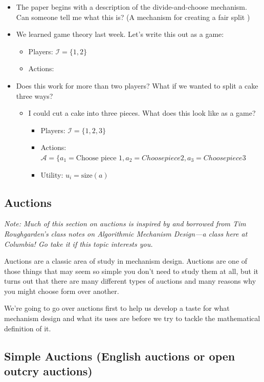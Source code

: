 \documentclass[11pt]{article}
\begin{document}
\begin{itemize}
    \item The paper begins with a description of the divide-and-choose mechanism. Can someone tell me what this is? (A mechanism for creating a fair split )
    \item We learned game theory last week. Let's write this out as a game:
    \begin{itemize}
        \item Players: $\mathcal{I} = \{1,2\}$
        \item Actions: 
    \end{itemize}
    \item Does this work for more than two players? What if we wanted to split a cake three ways?
    \begin{itemize}
        \item I could cut a cake into three pieces. What does this look like as a game?
        \begin{itemize}
            \item Players: $\mathcal{I} = \{1,2,3\}$
            \item Actions: $\mathcal{A} = \{a_1 = \text{Choose piece 1}, a_2 = {Choose piece 2}, a_3 = {Choose piece 3}$
            \item Utility: $u_i = \text{size}(a)$
        \end{itemize}
    \end{itemize}
\end{itemize}

\subsection{Auctions}

{\it Note: Much of this section on auctions is inspired by and borrowed from Tim Roughgarden's class notes on Algorithmic Mechanism Design---a class here at Columbia! Go take it if this topic interests you.}

Auctions are a classic area of study in mechanism design.
Auctions are one of those things that may seem so simple you don't need to study them at all, but it turns out that there are many different types of auctions and many reasons why you might choose form over another.

We're going to go over auctions first to help us develop a taste for what mechanism design and what its uses are before we try to tackle the mathematical definition of it. 

\subsection{Simple Auctions (English auctions or open outcry auctions)}
\end{document}
